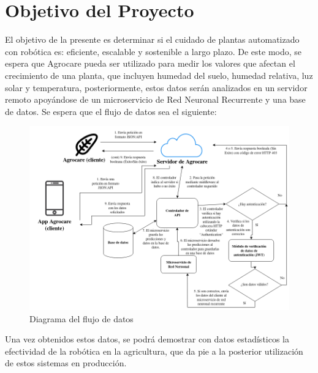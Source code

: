 \section{Objetivo del Proyecto}

El objetivo de la presente es determinar si el cuidado de plantas automatizado con robótica es: eficiente, escalable y sostenible a largo plazo. De este modo, se espera que Agrocare pueda ser utilizado para medir los valores que afectan el crecimiento de una planta, que incluyen humedad del suelo, humedad relativa, luz solar y temperatura, posteriormente, estos datos serán analizados en un servidor remoto apoyándose de un microservicio de Red Neuronal Recurrente y una base de datos. Se espera que el flujo de datos sea el siguiente:

\renewcommand{\figurename}{Figura}
\begin{figure}[h]
  \centering
  \includegraphics[width=\linewidth]{diagrama.png}
  \caption{Diagrama del flujo de datos}
  \label{fig:example}
\end{figure}

Una vez obtenidos estos datos, se podrá demostrar con datos estadísticos la efectividad de la robótica en la agricultura, que da pie a la posterior utilización de estos sistemas en producción.